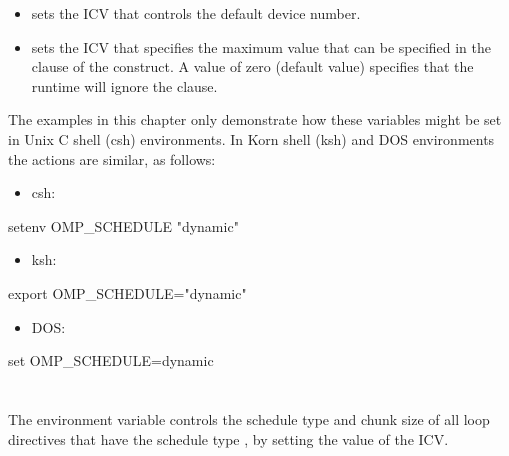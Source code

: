 \begin{itemize}
\item {} sets the  ICV that controls the default 
device number.

\item {} sets the  ICV that specifies the maximum
value that can be specified in the  clause of the  construct. A value of
zero (default value) specifies that the runtime will ignore the  clause.

\end{itemize}

The examples in this chapter only demonstrate how these variables might be set in Unix 
C shell (csh) environments. In Korn shell (ksh) and DOS environments the actions are 
similar, as follows:

\begin{itemize}
\item csh:
\end{itemize}

\begin{boxedcode}
setenv OMP\_SCHEDULE "dynamic"
\end{boxedcode}

\begin{itemize}
\item ksh:
\end{itemize}

\begin{boxedcode}
export OMP\_SCHEDULE="dynamic"
\end{boxedcode}

\begin{itemize}
\item DOS:
\end{itemize}

\begin{boxedcode}
set OMP\_SCHEDULE=dynamic
\end{boxedcode}










\section{}
\label{sec:OMP_SCHEDULE}
The  environment variable controls the schedule type and chunk size 
of all loop directives that have the schedule type , by setting the value of the 
 ICV.

